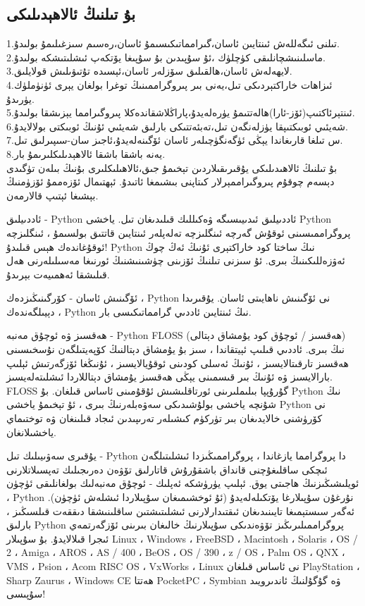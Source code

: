 \subsection{بۇ تىلنىڭ ئالاھېدىلىكى}
1.تىلنى ئىگەللەش ئىنتايىن ئاسان،گىرامماتىكىسىمۇ ئاسان،رەسىم سىزغىلىمۇ بولىدۇ.\\
2.ماسلىنىشچانلىقى كۈچلۈك ،ئۇ سۇپىدىن بۇ سۇپىغا يۆتكەپ ئىشلىتىشكە بولىدۇ.\\
3.لايھەلەش ئاسان،ھالقىلىق سۆزلەر ئاسان،ئېسىدە تۇتىۋىلىش قولايلىق.\\
4.ئىزاھات خاراكتېردىكى تىل،يەنى بىر پىروگراممىنىڭ توغرا بولغان يېرى ئۈنۈملۈك يۈرىدۇ.\\
5.ئىنتېرئاكتىپ(ئۆز-ئارا)ھالەتتىمۇ يۈرەلەيدۇ،پاراڭلاشقاندەكلا پىروگىرامما يېزىشقا بولىدۇ.\\
6.شەيئىي ئوبىكتىپقا يۈزلەنگەن تىل،تەبئەتتىكى بارلىق شەيئىي ئۇنىڭ ئوبىكتى بولالايدۇ.\\
7.س تىلغا قارىغاندا يېڭى ئۈگەنگۈچىلەر ئاسان ئۆگىنەلەيدۇ،ئاجىز سان-سىپىرلىق تىل.\\
8.يەنە باشقا باشقا ئالاھېدىلىكلىرىمۇ بار.\\
بۇ تىلنىڭ ئالاھىدىلىكى يۇقىرىقىلاردىن تېخىمۇ جىق،ئالاھىلىكلىرى بۇنىڭ بىلەن تۈگىدى دېسەم  چوقۇم پىروگىراممېرلار كىتاپنى بىشىمغا ئاتىدۇ. ئېھتىمال ئۆزەممۇ ئۆزۈمنىڭ بېشىغا ئېتىپ قالارمەن.\\
\par
ئاددىيلىق - Python ئاددىيلىق ئىدىيىسىگە ۋەكىللىك قىلىدىغان تىل. ياخشى Python پروگراممىسىنى ئوقۇش گەرچە ئىنگلىزچە تەلەپلەر ئىنتايىن قاتتىق بولسىمۇ ، ئىنگلىزچە ئوقۇغاندەك ھېس قىلىدۇ! Python نىڭ ساختا كود خاراكتېرى ئۇنىڭ ئەڭ چوڭ ئەۋزەللىكىنىڭ بىرى. ئۇ سىزنى تىلنىڭ ئۆزىنى چۈشىنىشنىڭ ئورنىغا مەسىلىلەرنى ھەل قىلىشقا ئەھمىيەت بېرىدۇ.
\par
 ئۆگىنىش ئاسان - كۆرگىنىڭىزدەك ، Python نى ئۆگىنىش ناھايىتى ئاسان. يۇقىرىدا دېيىلگەندەك ، Python نىڭ ئىنتايىن ئاددىي گرامماتىكىسى بار.
\par
 ھەقسىز ۋە ئوچۇق مەنبە - Python FLOSS (ھەقسىز / ئوچۇق كود يۇمشاق دېتالى) نىڭ بىرى. ئاددىي قىلىپ ئېيتقاندا ، سىز بۇ يۇمشاق دېتالنىڭ كۆپەيتىلگەن نۇسخىسىنى ھەقسىز تارقىتالايسىز ، ئۇنىڭ ئەسلى كودىنى ئوقۇيالايسىز ، ئۇنىڭغا ئۆزگەرتىش ئېلىپ بارالايسىز ۋە ئۇنىڭ بىر قىسمىنى يېڭى ھەقسىز يۇمشاق دېتاللاردا ئىشلىتەلەيسىز. FLOSS گۇرۇپپا بىلىملىرىنى ئورتاقلىشىش ئۇقۇمىنى ئاساس قىلغان. بۇ Python نىڭ شۇنچە ياخشى بولۇشىدىكى سەۋەبلەرنىڭ بىرى ، ئۇ تېخىمۇ ياخشى Python نى كۆرۈشنى خالايدىغان بىر تۈركۈم كىشىلەر تەرىپىدىن ئىجاد قىلىنغان ۋە توختىماي ياخشىلانغان.
\par
 يۇقىرى سەۋىيىلىك تىل - Python دا پروگرامما يازغاندا ، پروگراممىڭىزدا ئىشلىتىلگەن ئىچكى ساقلىغۇچنى قانداق باشقۇرۇش قاتارلىق تۆۋەن دەرىجىلىك تەپسىلاتلارنى ئويلىشىڭىزنىڭ ھاجىتى يوق. ئېلىپ يۈرۈشكە ئەپلىك - ئوچۇق مەنبەلىك بولغانلىقى ئۈچۈن ، Python نۇرغۇن سۇپىلارغا يۆتكىلەلەيدۇ (ئۇ ئوخشىمىغان سۇپىلاردا ئىشلەش ئۈچۈن). ئەگەر سىستېمىغا تايىنىدىغان ئىقتىدارلارنى ئىشلىتىشتىن ساقلىنىشقا دىققەت قىلسىڭىز ، بارلىق Python پروگراممىلىرىڭىز تۆۋەندىكى سۇپىلارنىڭ خالىغان بىرىنى ئۆزگەرتمەي ئىجرا قىلالايدۇ. بۇ سۇپىلار Linux ، Windows ، FreeBSD ، Macintosh ، Solaris ، OS / 2 ، Amiga ، AROS ، AS / 400 ، BeOS ، OS / 390 ، z / OS ، Palm OS ، QNX ، VMS ، Psion ، Acom RISC OS ، VxWorks ، Linux نى ئاساس قىلغان PlayStation ، Sharp Zaurus ، Windows CE ھەتتا PocketPC ، Symbian ۋە گۇگۇلنىڭ ئاندىرويىد سۇپىسى!

